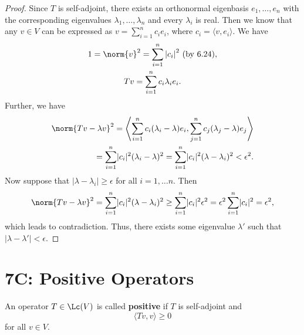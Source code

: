 \documentclass{extarticle}
\begin{document}
\begin{proof}
Since \(T\) is self-adjoint, there exists an orthonormal eigenbasis \(e_1, \ldots, e_n\)
with the corresponding eigenvalues \(\lambda_1, \ldots, \lambda_n\) and every \( \lambda_i \) is real.
Then we know that any \(v \in V\) can be expressed as \(v = \sum_{i=1}^{n} c_i e_i\), where
\( c_i = \langle v, e_i \rangle \). We have
\begin{gather*}
    1 = \norm{v}^2 = \sum_{i=1}^{n}{\lvert c_i \rvert}^2 ~ \mathrm{(by \ 6.24)}, \\
    T v = \sum_{i=1}^{n} c_i \lambda_i e_i.
\end{gather*}
Further, we have
\begin{align*}
    \norm{T v - \lambda v}^2 =
    \left\langle \sum_{i=1}^{n} c_i (\lambda_i - \lambda) e_i,
    \sum_{j=1}^{n} c_j (\lambda_j - \lambda) e_j\right\rangle
    \\ =
    \sum_{i=1}^{n} \lvert c_i \rvert^2 (\lambda_i - \lambda)^2
    = \sum_{i=1}^{n} \lvert c_i \rvert^2 (\lambda - \lambda_i)^2 < \epsilon^2.
\end{align*}
Now suppose that \(|\lambda - \lambda_i| \ge \epsilon\) for all \( i = 1, \dots n \). Then
\begin{align*}
    \norm{T v - \lambda v}^2 = \sum_{i=1}^{n} \lvert c_i \rvert^2 (\lambda - \lambda_i)^2
    \ge \sum_{i=1}^{n} \lvert c_i \rvert^2 \epsilon^2 =
    \epsilon^2 \sum_{i=1}^{n} \lvert c_i \rvert^2
    = \epsilon^2,
\end{align*}
which leads to contradiction. Thus, there exists some eigenvalue \( \lambda' \) such that
\(|\lambda - \lambda'| < \epsilon\).
\end{proof}


\newpage
\section*{7C: Positive Operators}

\begin{definition}
    An operator \(T \in \Lc(V)\) is called \textbf{positive} if \(T\) is self-adjoint and
    \[\langle Tv,v \rangle \geq 0\]
    for all \(v \in V\).
\end{definition}
\end{document}
